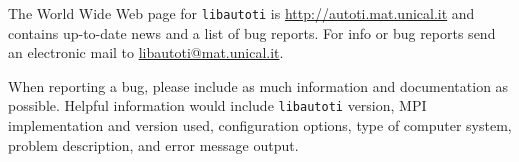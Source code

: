 The World Wide Web page for \verb"libautoti" is
\url{http://autoti.mat.unical.it} and contains up-to-date news and
a list of bug reports. For info or bug reports send an electronic
mail to
\href{mailto:libautoti@mat.unical.it}{libautoti@mat.unical.it}.

When reporting a bug, please include as much information and
documentation as possible. Helpful information would include
\verb"libautoti" version, MPI implementation and version used,
configuration options, type of computer system, problem
description, and error message output.
